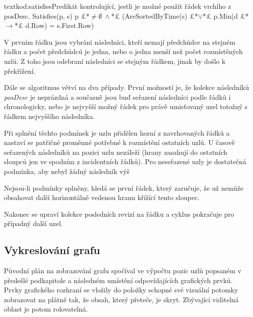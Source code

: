 \documentclass[
  biblatex,
  glossaries,
  index
]{kidiplom}
\begin{document}
\begin{kicode}{text}{kod:satisfies}{Predikát kontrolující, jestli je možné použít řádek vrchího z posDesc.}
Satisfies(p, s)
	p £*$\neq\emptyset\ \wedge{}$*£ (AreSortedByTime(s) £*$\vee$*£ p.Min(d £*$\to$*£ d.Row) = s.First.Row)
\end{kicode}

V prvním řádku jsou vybráni následníci, kteří nemají předchůdce na stejném řádku a počet předchůdců je jedna, nebo o jedna menší než počet rozmístěných uzlů. Z toho jsou odebraní následníci se stejným řádkem, jinak by došlo k překřížení.

Dále se algoritmus větví na dva případy. První možností je, že kolekce následníků {\it posDesc} je neprázdná a současně jsou buď seřazení následníci podle řádků i chronologicky, nebo je nejvyšší možný řádek pro právě umisťovaný uzel totožný s řádkem nejvyššího následníka.

Při splnění těchto podmínek je uzlu přidělen horní z navrhovaných řádků a nastaví se patřičné proměnné potřebné k rozmístění ostatních uzlů. U časově seřazených následníků na pozici uzlu nezáleží (hrany zasahují do ostatních sloupců jen ve spodním z incidentních řádků). Pro neseřazené uzly je dostatečná podmínka, aby nebyl žádný následník výš

Nejsou-li podmínky splněny, hledá se první řádek, který zaručuje, že už nemůže obsahovat další horizontálně vedenou hranu křížící tento sloupec.

Nakonec se upraví kolekce posledních revizí na řádku a cyklus pokračuje pro případný další uzel.

%
%
%

\subsection{Vykreslování grafu}
Původní plán na zobrazování grafu spočíval ve výpočtu pozic uzlů popsaném v předešlé podkapitole a následném umístění odpovídajících grafických prvků. Prvky grafického rozhraní se vložily do položky schopné své vizuální potomky zobrazovat na plátně tak, že obsah, který přeteče, je skryt. Zbývající viditelná oblast je potom rolovatelná.
\end{document}
